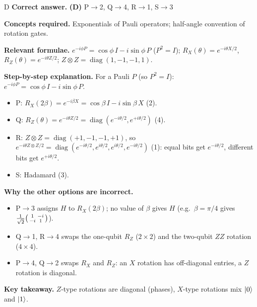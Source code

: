 \documentclass[11pt,a4paper]{article}
\newcommand{\qsep}{\par\vspace{2pt}{\color{black!15}\hrule}\vspace{4pt}}
\begin{document}
\begin{solbox}{D}
\textbf{\color{brand}Correct answer.} \textcolor{okgreen}{\textbf{(D)}} P$\to$2, Q$\to$4, R$\to$1, S$\to$3

\textbf{\color{brand}Concepts required.} Exponentials of Pauli operators; half-angle convention of rotation gates.

\textbf{\color{brand}Relevant formulae.} $e^{-i\phi P} = \cos\phi\,I - i\sin\phi\,P$ ($P^2 = I$); $R_X(\theta) = e^{-i\theta X/2}$, $R_Z(\theta) = e^{-i\theta Z/2}$; $Z\otimes Z = \operatorname{diag}(1,-1,-1,1)$.

\textbf{\color{brand}Step-by-step explanation.} For a Pauli $P$ (so $P^2 = I$): $e^{-i\phi P} = \cos\phi\, I - i\sin\phi\, P$.
\begin{itemize}\itemsep0pt
\item P: $R_X(2\beta) = e^{-i\beta X} = \cos\beta\, I - i\sin\beta\, X$ (2).
\item Q: $R_Z(\theta) = e^{-i\theta Z/2} = \operatorname{diag}(e^{-i\theta/2}, e^{+i\theta/2})$ (4).
\item R: $Z\otimes Z = \operatorname{diag}(+1, -1, -1, +1)$, so $e^{-i\theta Z\otimes Z/2} = \operatorname{diag}(e^{-i\theta/2}, e^{i\theta/2}, e^{i\theta/2}, e^{-i\theta/2})$ (1):
equal bits get $e^{-i\theta/2}$, different bits get $e^{+i\theta/2}$.
\item S: Hadamard (3).
\end{itemize}

\textbf{\color{brand}Why the other options are incorrect.}
\begin{itemize}[leftmargin=2.4em, itemsep=1pt, topsep=2pt]
\item[\textbf{(A)}] P$\to$3 assigns $H$ to $R_X(2\beta)$; no value of $\beta$ gives $H$ (e.g.\ $\beta = \pi/4$ gives $\frac{1}{\sqrt2}\begin{psmallmatrix}1&-i\\-i&1\end{psmallmatrix}$).
\item[\textbf{(B)}] Q$\to$1, R$\to$4 swaps the one-qubit $R_Z$ ($2\times2$) and the two-qubit $ZZ$ rotation ($4\times4$).
\item[\textbf{(C)}] P$\to$4, Q$\to$2 swaps $R_X$ and $R_Z$: an $X$ rotation has off-diagonal entries, a $Z$ rotation is diagonal.
\end{itemize}
\textbf{\color{brand}Key takeaway.} $Z$-type rotations are diagonal (phases), $X$-type rotations mix $\ket0$ and $\ket1$.
\end{solbox}
\qsep
\end{document}
